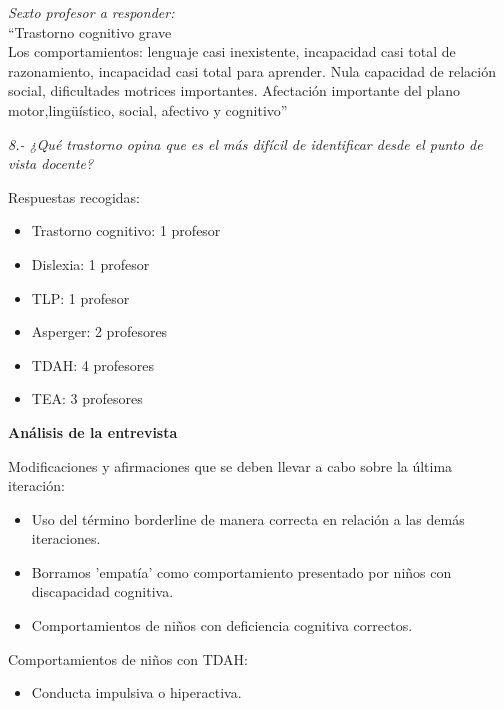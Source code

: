 \documentclass[letterpaper,12pt]{article}
\begin{document}
\begin{flushleft}
\emph{Sexto profesor a responder: }\\
``Trastorno cognitivo grave \\
Los comportamientos: lenguaje casi inexistente, incapacidad casi total de razonamiento, incapacidad casi total para aprender. Nula capacidad de relación social, dificultades motrices importantes. Afectación importante del plano motor,lingüístico, social, afectivo y cognitivo''
\end{flushleft}
\textit{8.- ¿Qué trastorno opina que es el más difícil de identificar desde el punto de vista docente?}\\

\begin{flushleft}
Respuestas recogidas:
\end{flushleft}

\begin{itemize}
\item Trastorno cognitivo: 1 profesor
\item Dislexia: 1 profesor
\item TLP: 1 profesor
\item Asperger: 2 profesores
\item TDAH: 4 profesores
\item TEA: 3 profesores\\
\end{itemize}

\begin{flushleft}
\textbf{Análisis de la entrevista}
\end{flushleft}
\begin{flushleft}
Modificaciones y afirmaciones que se deben llevar a cabo sobre la última iteración:
\end{flushleft}
\begin{itemize}
\item Uso del término borderline de manera correcta en relación a las demás iteraciones.
\item Borramos 'empatía' como comportamiento presentado por niños con discapacidad cognitiva.
\item Comportamientos de niños con deficiencia cognitiva correctos.
\end{itemize}

\begin{flushleft}
Comportamientos de niños con TDAH:
\end{flushleft}
\begin{itemize}
\item Conducta impulsiva o hiperactiva.
\end{itemize}
\end{document}
